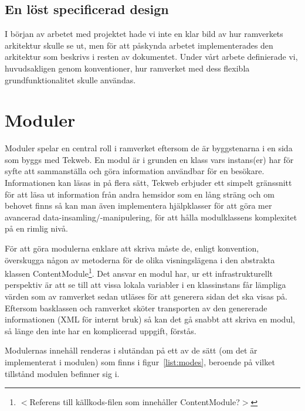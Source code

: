 \subsection*{En löst specificerad design}
I början av arbetet med projektet hade vi inte en klar bild av hur
ramverkets arkitektur skulle se ut, men för att påskynda arbetet
implementerades den arkitektur som beskrivs i resten av dokumentet.
Under vårt arbete definierade vi, huvudsakligen genom konventioner, hur
ramverket med dess flexibla grundfunktionalitet skulle användas.

\section{Moduler}
Moduler spelar en central roll i ramverket eftersom de är byggstenarna i
en sida som byggs med Tekweb. En modul är i grunden en klass vars
instans(er) har för syfte att sammanställa och göra information
användbar för en besökare.  Informationen kan läsas in på flera sätt,
Tekweb erbjuder ett simpelt gränssnitt för att läsa ut information från
andra hemsidor som en lång sträng och om behovet finns så kan man även
implementera hjälpklasser för att göra mer avancerad
data-insamling/-manipulering, för att hålla modulklassens komplexitet på
en rimlig nivå.

För att göra modulerna enklare att skriva måste de, enligt konvention,
överskugga någon av metoderna för de olika visningslägena i den
abstrakta klassen ContentModule\footnote{$<$Referens till källkods-filen
som innehåller ContentModule?$>$}. Det ansvar en modul har, ur ett
infrastrukturellt perspektiv är att se till att vissa lokala variabler i
en klassinstans får lämpliga värden som av ramverket sedan utläses för
att generera sidan det ska visas på. Eftersom basklassen och ramverket
sköter transporten av den genererade informationen (XML för internt
bruk) så kan det gå snabbt att skriva en modul, så länge den inte har en
komplicerad uppgift, förstås.

Modulernas innehåll renderas i slutändan på ett av de sätt (om det är
implementerat i modulen) som finns i figur~\ref{list:modes}, beroende på
vilket tillstånd modulen befinner sig i.


